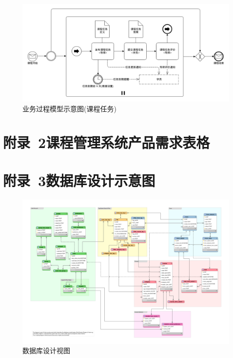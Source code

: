 \begin{figure}[!hbp]
  \begin{center}
    \includegraphics[width=\textwidth]{figures/diagram-bpm-course-task.png}
    \caption{业务过程模型示意图(课程任务)\label{BPMTask}}
  \end{center}
\end{figure}

\newpage

\section*{附录~2\quad	课程管理系统产品需求表格}
\label{sec:appendix-requirement-table}


\newpage

\section*{附录~3\quad	数据库设计示意图}
\label{sec:appendix-database-diagram}

\begin{figure}[!h]
  \begin{center}
    \includegraphics[angle=90, scale=0.5]{figures/eer-120dpi.png}
    \caption{数据库设计视图\label{FullDatabaseDesign}}
  \end{center}
\end{figure}

